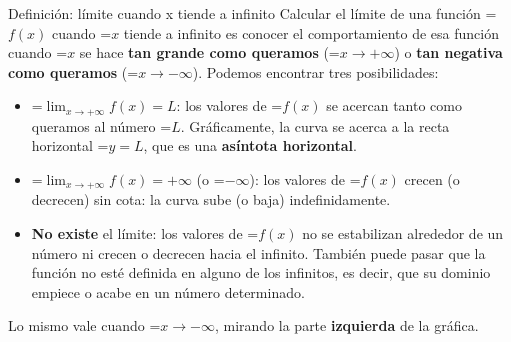 \documentclass[11pt,a4paper]{article}
\newcommand{\fmm}[1]{\setbox0=\hbox{$#1$}\ifdim\wd0>\linewidth\[#1\]\else\mbox{\box0}\fi}
\begin{document}
  
\begin{fmdef}{Definición: límite cuando x tiende a infinito}
Calcular el límite de una función \fmm{f(x)} cuando \fmm{x} tiende a infinito es conocer el comportamiento de esa función cuando \fmm{x} se hace \textbf{tan grande como queramos} (\fmm{x\to+\infty}) o \textbf{tan negativa como queramos} (\fmm{x\to-\infty}). Podemos encontrar tres posibilidades:

      
\begin{itemize}
\item \fmm{\displaystyle\lim_{x\to+\infty}f(x)=L}: los valores de \fmm{f(x)} se acercan tanto como queramos al número \fmm{L}. Gráficamente, la curva se acerca a la recta horizontal \fmm{y=L}, que es una \textbf{asíntota horizontal}.
\item \fmm{\displaystyle\lim_{x\to+\infty}f(x)=+\infty} (o \fmm{-\infty}): los valores de \fmm{f(x)} crecen (o decrecen) sin cota: la curva sube (o baja) indefinidamente.
\item \textbf{No existe} el límite: los valores de \fmm{f(x)} no se estabilizan alrededor de un número ni crecen o decrecen hacia el infinito. También puede pasar que la función no esté definida en alguno de los infinitos, es decir, que su dominio empiece o acabe en un número determinado.
\end{itemize}

      

Lo mismo vale cuando \fmm{x\to-\infty}, mirando la parte \textbf{izquierda} de la gráfica.
\end{fmdef}
\end{document}
